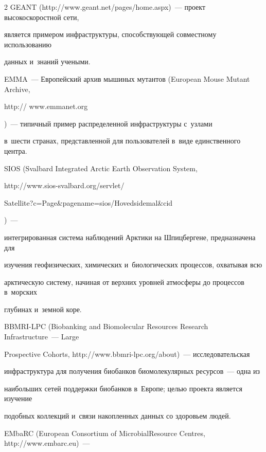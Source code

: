 \begin{multicols}{2}
  GEANT ({\sf http://www.geant.net/pages/home.\linebreak aspx})~--- проект высокоскоростной сети, 


является примером инфраструктуры, способствующей совместному использованию 


данных и~знаний учеными.


  


  EMMA~--- Европейский архив мышиных мутантов (European Mouse Mutant Archive, {\sf 


http:// www.emmanet.org})~--- типичный пример распределенной инфраструктуры с~узлами 


в~шести странах, представленной для пользователей в~виде единственного центра.


  


  SIOS (Svalbard Integrated Arctic Earth Observation System,  


{\sf http://www.sios-svalbard.org/servlet/\linebreak 


Satellite?c=Page\&pagename=sios/Hovedsidemal\&cid})~--- 


интегрированная система наблюдений Арктики на Шпицбергене, предназначена для 


изучения геофизических, химических и~биологических процессов, охватывая всю 


арктическую систему, начиная от верхних уровней атмосферы до процессов в~морских 


глубинах и~земной коре.


  


  BBMRI-LPC (Biobanking and Biomolecular Resources Research Infrastructure~--- Large 


Prospective Cohorts, {\sf http://www.bbmri-lpc.org/about})~--- исследовательская 


инфраструктура для получения биобанков биомолекулярных ресурсов~--- одна из 


наибольших сетей поддержки биобанков в~Европе; \mbox{целью} проекта является изучение 


подобных коллекций и~связи накопленных данных со здоровьем людей.


  


  EMbaRC (European Consortium of Microbial\linebreak Resource Centres, {\sf http://www.embarc.eu})~--- 



\end{multicols}
